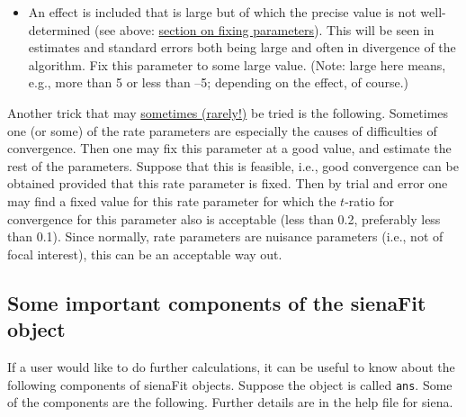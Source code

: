 \documentclass[a4paper,fleqn,11pt]{article}
\newcommand{\+}{\, + \,}
\begin{document}
\begin{itemize}
      in the sense that they can both explain the same observed structures.
      This will be seen in high absolute values of
      correlations between parameter estimates, presented in the
      \textsf{summary} of the results object and also in the output file.
      In this case it may be better to exclude one of these effects from the model.
\item An effect is included that is large but of which the precise
      value is not well-determined (see above:
      \hyperlink{T_fix}{section on fixing parameters}).
      This will be seen in estimates and standard errors both being large
      and often in divergence of the algorithm.
      Fix this parameter to some large value.
      (Note: large here means, e.g., more than 5 or less than --5; depending
      on the effect, of course.)
\end{itemize}

Another trick that may \underline{sometimes (rarely!)} be tried is the following.
Sometimes one (or some) of the rate parameters are especially the causes of
difficulties of convergence.
Then one may fix this parameter at a good value, and estimate the rest
of the parameters. Suppose that this is feasible, i.e., good convergence can be
obtained provided that this rate parameter is fixed. Then by trial and error
one may find a fixed value for this rate parameter for which the $t$-ratio for
convergence for this parameter also is acceptable
(less than 0.2, preferably less than 0.1).
Since normally, rate parameters are nuisance parameters (i.e., not of focal interest),
this can be an acceptable way out.



\subsection{Some important components of the \textsf{sienaFit} object}
\label{S_fitcomp}

If a user would like to do further calculations, it can be
useful to know about the following components of  \textsf{sienaFit} objects.
Suppose the object is called \texttt{ans}. Some of the components
are the following.
Further details are in the help file for \textsf{siena}.
\end{document}
